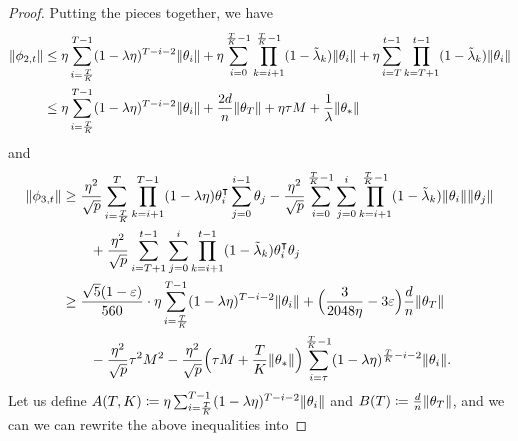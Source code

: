 \begin{proof}
    
    Putting the pieces together, we have
    \begin{align*}
        \|\phi_{2,t}\| & \leq  \eta\sum_{i=\frac{T}{K}}^{T-1} (1-\lambda\eta)^{T-i-2} \|\theta_i\| + \eta\sum_{i=0}^{\frac{T}{K}-1}\prod_{k=i+1}^{\frac{T}{K}-1}(1-\tilde{\lambda}_k) \|\theta_i\| + \eta\sum_{i=T}^{t-1} \prod_{k=T+1}^{t-1}(1-\tilde{\lambda}_k) \|\theta_i\| \\
        & \leq \eta\sum_{i=\frac{T}{K}}^{T-1} (1-\lambda\eta)^{T-i-2} \|\theta_i\| + \frac{2d}{n} \|\theta_T\| + \eta\tau M + \frac{1}{\lambda} \|\theta_*\| 
    \end{align*}
    and 
    \begin{align*}
        \|\phi_{3,t}\| 
        & \geq \frac{\eta^2}{\sqrt p}\sum_{i=\frac{T}{K}}^{T}\prod_{k=i+1}^{T-1}(1-\lambda\eta)\theta_i\transpose\sum_{j=0}^{i-1} \theta_j - \frac{\eta^2}{\sqrt p}\sum_{i=0}^{\frac{T}{K}-1}\sum_{j=0}^i\prod_{k=i+1}^{\frac{T}{K}-1}(1-\tlam_k) \|\theta_i\|\|\theta_j\| \\
        & \qquad + \frac{\eta^2}{\sqrt p}\sum_{i=T+1}^{t-1}\sum_{j=0}^i\prod_{k=i+1}^{t-1}(1-\tlam_k) \theta_i\transpose \theta_j \\
        & \geq \frac{\sqrt{5}(1-\eps)}{560} \cdot \eta\sum_{i=\frac{T}{K}}^{T-1}(1-\lambda\eta)^{T-i-2} \|\theta_i\| + \Big( \frac{3}{2048\eta} - 3\eps \Big) \frac{d}{n} \|\theta_T\| \\
        & \qquad - \frac{\eta^2}{\sqrt p} \tau^2 M^2 - \frac{\eta^2}{\sqrt p} \Big( \tau M + \frac{T}{K} \|\theta_*\| \Big) \sum_{i=\tau}^{\frac{T}{K}-1}(1 - \lambda\eta)^{\frac{T}{K}-i-2} \|\theta_i\|.
    \end{align*}
    Let us define $A(T,K) \coloneqq \eta\sum_{i=\frac{T}{K}}^{T-1}(1-\lambda\eta)^{T-i-2} \|\theta_i\|$ and $B(T) \coloneqq \frac{d}{n} \|\theta_T\|$, and we can we can rewrite the above inequalities into

\end{proof}
